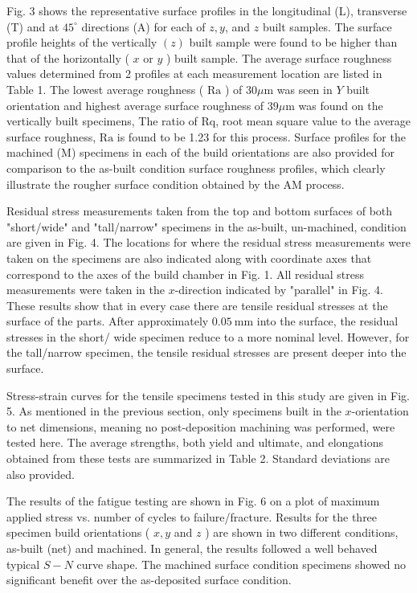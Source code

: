 \documentclass[10pt]{article}
\begin{document}
Fig. 3 shows the representative surface profiles in the longitudinal (L), transverse (T) and at $45^{\circ}$ directions (A) for each of $z, y$, and $z$ built samples. The surface profile heights of the vertically $(z)$ built sample were found to be higher than that of the horizontally ( $x$ or $y$ ) built sample. The average surface roughness values determined from 2 profiles at each measurement location are listed in Table 1. The lowest average roughness ( $\mathrm{Ra}$ ) of $30 \mu \mathrm{m}$ was seen in $Y$ built orientation and highest average surface roughness of $39 \mu \mathrm{m}$ was found on the vertically built specimens, The ratio of $\mathrm{Rq}$, root mean square value to the average surface roughness, $\mathrm{Ra}$ is found to be 1.23 for this process. Surface profiles for the machined (M) specimens in each of the build orientations are also provided for comparison to the as-built condition surface roughness profiles, which clearly illustrate the rougher surface condition obtained by the AM process.

Residual stress measurements taken from the top and bottom surfaces of both "short/wide" and "tall/narrow" specimens in the as-built, un-machined, condition are given in Fig. 4. The locations for where the residual stress measurements were taken on the specimens are also indicated along with coordinate axes that correspond to the axes of the build chamber in Fig. 1. All residual stress measurements were taken in the $x$-direction indicated by "parallel" in Fig. 4. These results show that in every case there are tensile residual stresses at the surface of the parts. After approximately $0.05 \mathrm{~mm}$ into the surface, the residual stresses in the short/ wide specimen reduce to a more nominal level. However, for the tall/narrow specimen, the tensile residual stresses are present deeper into the surface.

Stress-strain curves for the tensile specimens tested in this study are given in Fig. 5. As mentioned in the previous section, only specimens built in the $x$-orientation to net dimensions, meaning no post-deposition machining was performed, were tested here. The average strengths, both yield and ultimate, and elongations obtained from these tests are summarized in Table 2. Standard deviations are also provided.

The results of the fatigue testing are shown in Fig. 6 on a plot of maximum applied stress vs. number of cycles to failure/fracture. Results for the three specimen build orientations ( $x, y$ and $z$ ) are shown in two different conditions, as-built (net) and machined. In general, the results followed a well behaved typical $S-N$ curve shape. The machined surface condition specimens showed no significant benefit over the as-deposited surface condition.
\end{document}
